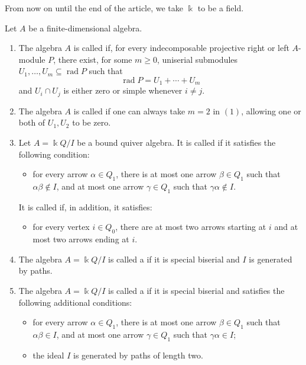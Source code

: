 \documentclass[a4paper,leqno]{amsart}
\begin{document}
From now on until the end of the article, we take $\Bbbk$ to be a field.

\begin{dfn}
Let $A$ be a finite-dimensional algebra.
\begin{enumerate}
\item The algebra $A$ is called  if, for every indecomposable projective right or left $A$-module $P$, there exist, for some $m\geq0$, uniserial submodules $U_1,\ldots,U_m\subseteq\operatorname{rad}P$ such that
$$
\operatorname{rad}P=U_1+\cdots+U_m
$$
and $U_i\cap U_j$ is either zero or simple whenever $i\neq j$.

\item The algebra $A$ is called  if one can always take
$m=2$ in $(1)$, allowing one or both of $U_1,U_2$ to be zero.

\item Let $A=\Bbbk Q/I$ be a bound quiver algebra. It is called  if it satisfies the following condition:
\begin{itemize}
\item[(SM)] for every arrow $\alpha\in Q_1$, there is at most one arrow $\beta\in Q_1$ such that $\alpha\beta\notin I$, and at most one arrow $\gamma\in Q_1$ such that $\gamma\alpha\notin I$.
\end{itemize}
It is called  if, in addition, it satisfies:
\begin{itemize}
\item[(SB)] for every vertex $i\in Q_0$, there are at most two arrows starting at $i$ and at most two arrows ending at $i$.
\end{itemize}

\item The algebra $A=\Bbbk Q/I$ is called a  if it is special biserial and $I$ is generated by paths.

\item The algebra $A=\Bbbk Q/I$ is called a  if it is special biserial and satisfies the following additional conditions:
\begin{itemize}
\item[(G1)] for every arrow $\alpha\in Q_1$, there is at most one arrow $\beta\in Q_1$ such that $\alpha\beta\in I$, and at most one arrow $\gamma\in Q_1$ such that $\gamma\alpha\in I$;
\item[(G2)] the ideal $I$ is generated by paths of length two.
\end{itemize}
\end{enumerate}
\end{dfn}
\end{document}
